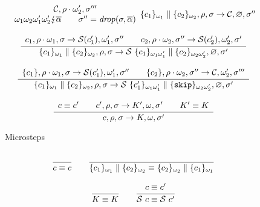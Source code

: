 \begin{figure}
$$\begin{array}{c}
{\begin{array}{c}
        {\mathcal{C}},\rho\cdot \omega_2' ,\sigma'''
        \\
        \omega_1\omega_2\omega_1'\omega_2' \lightning \overline{\alpha} \qquad \sigma''={\mathit{drop}}(\sigma, \overline{\alpha})
      \end{array}
      }{
      \{c_1\}_{\omega_1} \parallel \{c_2\}_{\omega_2}, \rho,\sigma\rightarrow
      {\mathcal{C}}, \varnothing,\sigma''
      }
      \\\\
      \cfrac{
      \begin{array}{c}
        c_1, \rho \cdot \omega_1, \sigma \rightarrow
        {\mathcal{S}}(c_1') ,\omega_1' , \sigma''
        \qquad
        c_2, \rho \cdot \omega_2 , \sigma'' \rightarrow
        {\mathcal{S}}(c_2') ,\omega_2' ,\sigma'
      \end{array}
      }{
      \{c_1\}_{\omega_1} \parallel \{c_2\}_{\omega_2}, \rho ,\sigma \rightarrow
      {\mathcal{S}}~\{c_1\}_{\omega_1\omega_1'} \parallel \{c_2\}_{\omega_2\omega_2'}, \varnothing, \sigma'
      }
      \\\\
      \cfrac{
      \begin{array}{c}
        \{c_1\}, \rho \cdot \omega_1, \sigma \rightarrow
        {\mathcal{S}}(c_1') ,\omega_1' , \sigma''
        \qquad
        \{c_2\}, \rho \cdot \omega_2 , \sigma'' \rightarrow
        {\mathcal{C}} ,\omega_2' ,\sigma'''
      \end{array}
      }{
      \{c_1\}_{\omega_1} \parallel \{c_2\}_{\omega_2}, \rho ,\sigma \rightarrow
      {\mathcal{S}}~\{c_1'\}_{\omega_1\omega_1'} \parallel \{{\tt{skip}}\}_{\omega_2\omega_2'}, \varnothing,\sigma'
      }
      \\\\
      \cfrac{
        \begin{array}{c}
          c \equiv c' \qquad c',\rho,\sigma \rightarrow K',\omega,\sigma' \qquad K' \equiv K
        \end{array}
      }{
        c, \rho ,\sigma \rightarrow
        K,\omega,\sigma'
      }
    \end{array}
  $$
  \caption{Microsteps}
  \label{fig:sem3}
\end{figure}
$$
  \begin{array}{c}
    \cfrac{}{c \equiv c} \qquad
    \cfrac{}
    {
    \{c_1\}_{\omega_1} \parallel \{c_2\}_{\omega_2} \equiv
    \{c_2\}_{\omega_2} \parallel \{c_1\}_{\omega_1}
    }
    \\\\
    \cfrac{}{K \equiv K} \qquad
    \cfrac{c \equiv c'}{{\mathcal{S}}~c \equiv {\mathcal{S}}~c'}
  \end{array}
$$

